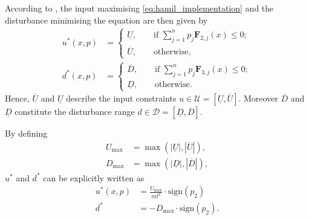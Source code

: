 \documentclass[../main.tex]{subfiles}
\begin{document}
According to \cite{mitchell2004toolbox}, the input maximising \eqref{eq:hamil_implementation} and the disturbance minimising the equation are then given by 
\begin{align}
    u^*(x,p)&=
\begin{cases}
  \underline{U},\qquad \text{if } \sum_{j=1}^n p_j \textbf{F}_{2,j}(x)\leq 0;\\
  \overline{U}, \qquad \text{otherwise,}
\end{cases}\\
    d^*(x,p)&=
\begin{cases}
  \overline{D},\qquad \text{if } \sum_{j=1}^n p_j \textbf{F}_{3,j}(x)\leq 0;\\
  \underline{D}, \qquad \text{otherwise}.
\end{cases}
\end{align}
Hence, $\overline{U}$ and $\underline{U}$ describe the input constraints $u\in \mathcal{U} = [\underline{U},\overline{U}]$. Moreover $\overline{D}$ and $\underline{D}$ constitute the disturbance range $d\in \mathcal{D} = [\underline{D},\overline{D}]$. 

\iffalse

By defining 
\begin{align}
    U_{\text{max}} &= \max(|\underline{U}|,|\overline{U}|), \\
    D_{\text{max}} &= \max(|\underline{D}|,|\overline{D}|), 
\end{align} 
$u^*$ and $d^*$ can be explicitly written as
\begin{align}
    u^*(x,p) &= \frac{U_{\text{max}}}{ml^2} \cdot \text{sign}(p_2)\\
    d^* &= -D_{\text{max}} \cdot \text{sign}(p_2).
\end{align}
\end{document}
